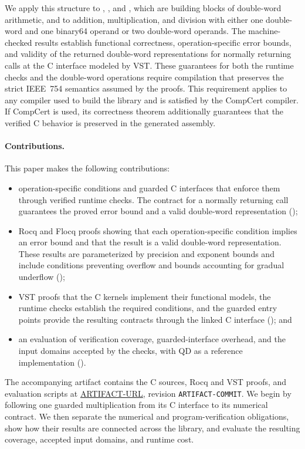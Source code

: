 We apply this structure to \TwoSum{}, \FastTwoSum{}, and \FastTwoMult{}, which
are building blocks of double-word arithmetic, and to addition, multiplication,
and division with either one double-word and one binary64 operand or two
double-word operands.  The machine-checked results establish functional
correctness, operation-specific error bounds, and validity of the returned
double-word representations for normally returning calls at the C interface
modeled by VST.  These guarantees for both the runtime checks and the
double-word operations require compilation that preserves the strict
IEEE~754 semantics assumed by the proofs.  This requirement applies to any
compiler used to build the library and is satisfied by the CompCert compiler.
If CompCert is used, its correctness theorem additionally guarantees that the
verified C behavior is preserved in the generated assembly.

\paragraph{Contributions.}
This paper makes the following contributions:
\begin{itemize}
  \item operation-specific conditions and guarded C interfaces that enforce
        them through verified runtime checks.  The contract for a normally
        returning call guarantees the proved error bound and a valid
        double-word representation ();

  \item Rocq and Flocq proofs showing that each operation-specific condition
        implies an error bound and that the result is a valid double-word
        representation.  These results are parameterized by precision and
        exponent bounds and include conditions preventing overflow and bounds
        accounting for gradual underflow ();

  \item VST proofs that the C kernels implement their functional models, the
        runtime checks establish the required conditions, and the guarded
        entry points provide the resulting contracts through the linked C
        interface (); and

  \item an evaluation of verification coverage, guarded-interface overhead,
        and the input domains accepted by the checks, with QD as a reference
        implementation ().
\end{itemize}

The accompanying artifact contains the C sources, Rocq and VST proofs, and
evaluation scripts at \url{ARTIFACT-URL}, revision
\texttt{ARTIFACT-COMMIT}.  We begin by following one guarded multiplication
from its C interface to its numerical contract.  We then separate the
numerical and program-verification obligations, show how their results are
connected across the library, and evaluate the resulting coverage, accepted
input domains, and runtime cost.